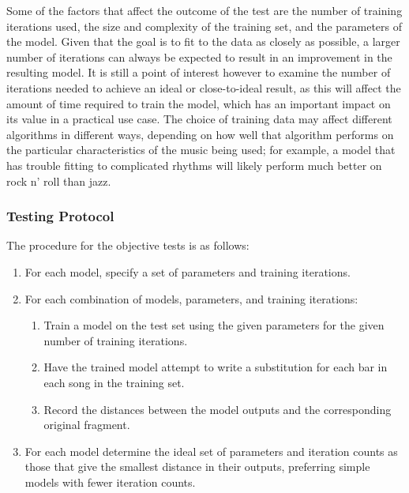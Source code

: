 \documentclass[ author={Stephen Livermore-Tozer},
				supervisor={Dr. Peter Flach},
				degree={MEng},
				title={Algorithmic Co-composition Using Machine Learning},
				subtitle={},
				type={research},
				year={2016} ]{dissertation}
\begin{document}
	Some of the factors that affect the outcome of the test are the number of training iterations used, the size and complexity of the training set, and the parameters of the model. Given that the goal is to fit to the data as closely as possible, a larger number of iterations can always be expected to result in an improvement in the resulting model. It is still a point of interest however to examine the number of iterations needed to achieve an ideal or close-to-ideal result, as this will affect the amount of time required to train the model, which has an important impact on its value in a practical use case. The choice of training data may affect different algorithms in different ways, depending on how well that algorithm performs on the particular characteristics of the music being used; for example, a model that has trouble fitting to complicated rhythms will likely perform much better on rock n' roll than jazz. 
	
	\subsubsection{Testing Protocol}
	
	The procedure for the objective tests is as follows:
	\begin{enumerate}
		\item For each model, specify a set of parameters and training iterations.
		\item For each combination of models, parameters, and training iterations:
		\begin{enumerate}
			\item Train a model on the test set using the given parameters for the given number of training iterations.
			\item Have the trained model attempt to write a substitution for each bar in each song in the training set.
			\item Record the distances between the model outputs and the corresponding original fragment.
		\end{enumerate}
		\item For each model determine the ideal set of parameters and iteration counts as those that give the smallest distance in their outputs, preferring simple models with fewer iteration counts.
	\end{enumerate}
	
\end{document}
